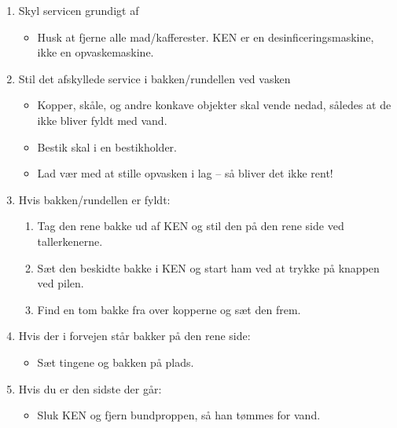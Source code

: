 
\begin{enumerate}

\bfseries \item Skyl servicen grundigt af \normalfont

  \begin{itemize}

  \item Husk at fjerne alle mad/kafferester.  KEN er en
    desinficeringsmaskine, ikke en opvaskemaskine.

  \end{itemize}

\bfseries \item Stil det afskyllede service i bakken/rundellen ved vasken
\normalfont

  \begin{itemize}

  \item Kopper, skåle, og andre konkave objekter skal vende nedad,
    således at de ikke bliver fyldt med vand.

  \item Bestik skal i en bestikholder.

  \item Lad vær med at stille opvasken i lag -- så bliver det ikke rent!

  \end{itemize}

\bfseries \item Hvis bakken/rundellen er fyldt: \normalfont
  \begin{enumerate}

  \item Tag den rene bakke ud af KEN og stil den på den rene side ved
    tallerkenerne.

  \item Sæt den beskidte bakke i KEN og start ham ved at trykke på
    knappen ved pilen.

  \item Find en tom bakke fra over kopperne og sæt den frem.

  \end{enumerate}

\bfseries \item Hvis der i forvejen står bakker på den rene side: \normalfont

  \begin{itemize}

  \item Sæt tingene og bakken på plads.

  \end{itemize}

\bfseries \item Hvis du er den sidste der går: \normalfont

  \begin{itemize}

  \item Sluk KEN og fjern bundproppen, så han tømmes for vand.

  \end{itemize}

\end{enumerate}

